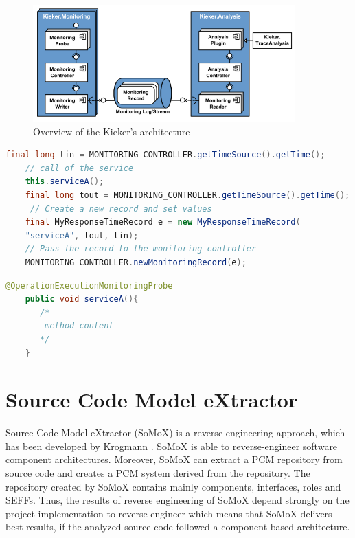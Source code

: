 \begin{figure}[h]
\centering
\includegraphics[width=0.9\textwidth]{figures/kieker}
\caption{Overview of the Kieker's architecture}
\label{fig:kieker}
\end{figure}

\begin{lstlisting}[caption={Example of manual instrumentation of source code},label={lst:kieker_manual_instr}, captionpos=b, language=java] 
    final long tin = MONITORING_CONTROLLER.getTimeSource().getTime();
    // call of the service
    this.serviceA();
    final long tout = MONITORING_CONTROLLER.getTimeSource().getTime();
     // Create a new record and set values
    final MyResponseTimeRecord e = new MyResponseTimeRecord(
    "serviceA", tout, tin);
    // Pass the record to the monitoring controller
    MONITORING_CONTROLLER.newMonitoringRecord(e);
\end{lstlisting}


\begin{lstlisting}[caption={Example of a Kieker Probe using AOP},label={lst:kieker_aop_instr}, captionpos=b, language=java] 
    @OperationExecutionMonitoringProbe
    public void serviceA(){
       /*
        method content
       */
    }
\end{lstlisting}


\section{Source Code Model eXtractor}
\label{sec:Source Code Model eXtractor}
Source Code Model eXtractor (SoMoX) is a reverse engineering approach, which has been developed by Krogmann \cite{krogmann2012reconstruction}. SoMoX is able to reverse-engineer software component architectures. Moreover, SoMoX can extract a PCM repository from source code and creates a PCM system derived from the repository. The repository created by SoMoX contains mainly components, interfaces, roles and SEFFs. Thus, the results of reverse engineering of SoMoX depend strongly on the project implementation to reverse-engineer which means that SoMoX delivers best results, if the analyzed source code followed a component-based architecture.\\

